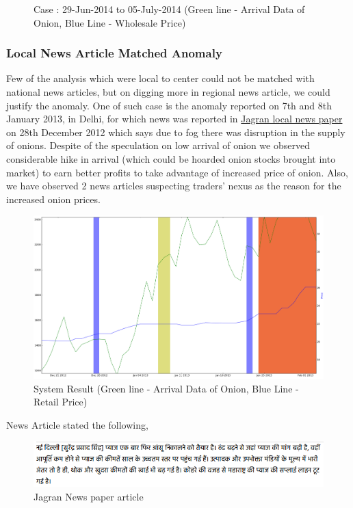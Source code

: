 \begin{itemize}
\begin{figure}[H]
      \caption{Case : 29-Jun-2014 to 05-July-2014 (Green line - Arrival Data of Onion, Blue Line - Wholesale Price)}
      \label{fig:Delhi_WSvsArrival_ill1}
      \end{figure}
\end{itemize}

\subsubsection{Local News Article Matched Anomaly}
Few of the analysis which were local to center could not be matched with national news articles, but on digging more in regional news article, we could justify the anomaly. One of such case is the anomaly reported on 7th and 8th January 2013, in Delhi, for which news was reported in \href{http://www.jagran.com/news/business-onion-price-affected-from-fog-9987751.html}{Jagran local news paper} on 28th December 2012 which says due to fog there was disruption in the supply of onions. Despite of the speculation on low arrival of onion we observed considerable hike in arrival (which could be hoarded onion stocks brought into market) to earn better profits to take advantage of increased price of onion. Also, we have observed 2 news articles suspecting traders' nexus as the reason for the increased onion prices.


			\begin{figure}[H]
		    	\centering
  		    	\includegraphics[width=1.1\textwidth]{graphs/localDelhiRegionalNewsPlusNexus.png}
		    	\caption{System Result (Green line - Arrival Data of Onion, Blue Line - Retail Price)}
		    	\label{fig:localExample}
			\end{figure}
			
News Article stated the following,

		\begin{figure}[H]
		    	\centering
  		    	\includegraphics[width=1.1\textwidth]{graphs/localDelhiFog.png}
		    	\caption{Jagran News paper article}
		    	\label{fig:localDelhiFog}
		\end{figure}

